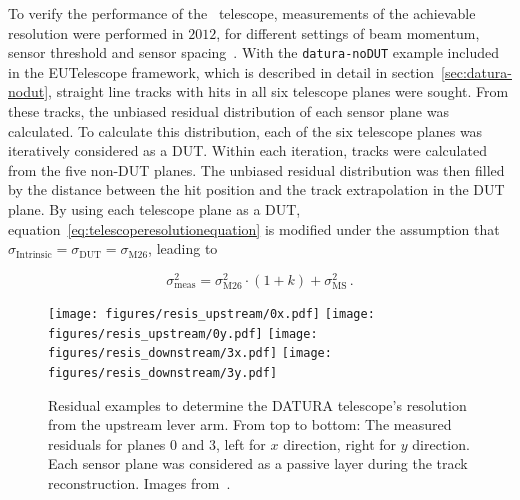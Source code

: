 To verify the performance of the \Datura~telescope, measurements of the achievable resolution were performed in $2012$, for different settings of beam momentum,
 sensor threshold and sensor spacing~\cite{ref:thomas}.
With the \texttt{datura-noDUT} example included in the {EUTelescope} framework, which is described in detail in section~\ref{sec:datura-nodut},
 straight line tracks with hits in all six telescope planes were sought. 
From these tracks, the unbiased residual distribution of each sensor plane was calculated.
To calculate this distribution, each of the six telescope planes was iteratively considered as a DUT.
Within each iteration, tracks were calculated from the five non-DUT planes.
The unbiased residual distribution was then filled by the distance between the hit position and the track extrapolation in the DUT plane.
By using each telescope plane as a DUT, equation~\ref{eq:telescoperesolutionequation} is modified under the assumption that $\sigma_{\textrm{Intrinsic}} = \sigma_{\textrm{DUT}} = \sigma_{\textrm{M26}}$,
 leading to

\begin{equation}
\label{eq:telescoperesolutionequation_2}
\sigma_{\textrm{meas}}^2 = \sigma_{\textrm{M26}}^2 \cdot \left( 1 + k \right) +
\sigma_{\textrm{MS}}^2\,.
\end{equation}

\begin{figure}[tb]
  \centering
  \texttt{[image: figures/resis\_upstream/0x.pdf]}
  \texttt{[image: figures/resis\_upstream/0y.pdf]}
  \texttt{[image: figures/resis\_downstream/3x.pdf]}
  \texttt{[image: figures/resis\_downstream/3y.pdf]}
  \caption[Residual examples to determine the \DATURA telescope's resolution~\cite{ref:thomas}]{Residual examples to determine the DATURA telescope's resolution from the upstream lever arm.
From top to bottom: The measured residuals for planes $0$ and $3$, left for $x$ direction, right for $y$ direction.
Each sensor plane was considered as a passive layer during the track reconstruction.
Images from~\cite{ref:thomas}.}
  \label{fig:residualexample1}
\end{figure}


